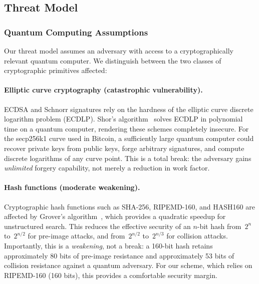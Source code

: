 \documentclass[11pt, a4paper]{article}
\begin{document}
\subsection{Threat Model}
\label{sec:threat-model}

\subsubsection{Quantum Computing Assumptions}
\label{sec:quantum-assumptions}

Our threat model assumes an adversary with access to a cryptographically relevant quantum computer. We distinguish between the two classes of cryptographic primitives affected:

\paragraph{Elliptic curve cryptography (catastrophic vulnerability).}
ECDSA and Schnorr signatures rely on the hardness of the elliptic curve discrete logarithm problem (ECDLP). Shor's algorithm~\cite{shor1994} solves ECDLP in polynomial time on a quantum computer, rendering these schemes completely insecure. For the secp256k1 curve used in Bitcoin, a sufficiently large quantum computer could recover private keys from public keys, forge arbitrary signatures, and compute discrete logarithms of any curve point. This is a total break: the adversary gains \emph{unlimited} forgery capability, not merely a reduction in work factor.

\paragraph{Hash functions (moderate weakening).}
Cryptographic hash functions such as SHA-256, RIPEMD-160, and HASH160 are affected by Grover's algorithm~\cite{grover1996}, which provides a quadratic speedup for unstructured search. This reduces the effective security of an $n$-bit hash from~$2^n$ to~$2^{n/2}$ for pre-image attacks, and from~$2^{n/2}$ to~$2^{n/3}$ for collision attacks. Importantly, this is a \emph{weakening}, not a break: a 160-bit hash retains approximately 80 bits of pre-image resistance and approximately 53 bits of collision resistance against a quantum adversary. For our scheme, which relies on RIPEMD-160 (160 bits), this provides a comfortable security margin.
\end{document}

